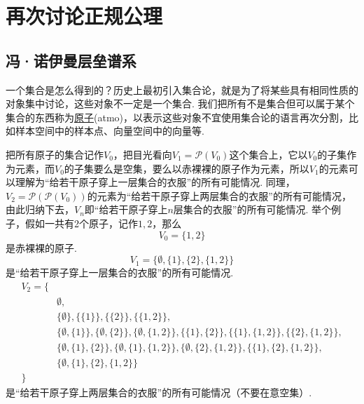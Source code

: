 \documentclass[main.tex]{subfiles}
\begin{document}

\section{再次讨论正规公理}

\subsection{冯·诺伊曼层垒谱系}

一个集合是怎么得到的？历史上最初引入集合论，就是为了将某些具有相同性质的对象集中讨论，这些对象不一定是一个集合. 我们把所有不是集合但可以属于某个集合的东西称为\uline{原子}(atmo)，以表示这些对象不宜使用集合论的语言再次分割，比如样本空间中的样本点、向量空间中的向量等. 

把所有原子的集合记作\(V_0\)，把目光看向\(V_1 = \mathcal{P}(V_0)\)这个集合上，它以\(V_0\)的子集作为元素，而\(V_0\)的子集要么是空集，要么以赤裸裸的原子作为元素，所以\(V_1\)的元素可以理解为“给若干原子穿上一层集合的衣服”的所有可能情况. 同理，\(V_2 = \mathcal{P}(\mathcal{P}(V_0))\)的元素为“给若干原子穿上两层集合的衣服”的所有可能情况，由此归纳下去，\(V_n\)即“给若干原子穿上\(n\)层集合的衣服”的所有可能情况. 举个例子，假如一共有2个原子，记作\(1,2\)，那么
\[V_0 = \{1,2\}\]
是赤裸裸的原子.
\[V_1 = \{\emptyset,\{1\},\{2\},\{1,2\}\}\]
是“给若干原子穿上一层集合的衣服”的所有可能情况.
\begin{align*}
    V_2 = \{& \\
    &\emptyset,\\
    &\{\emptyset\},\{\{1\}\},\{\{2\}\},\{\{1,2\}\},\\
    &\{\emptyset,\{1\}\},\{\emptyset,\{2\}\},\{\emptyset,\{1,2\}\},\{\{1\},\{2\}\},\{\{1\},\{1,2\}\},\{\{2\},\{1,2\}\},\\
    &\{\emptyset,\{1\},\{2\}\},\{\emptyset,\{1\},\{1,2\}\},\{\emptyset,\{2\},\{1,2\}\},\{\{1\},\{2\},\{1,2\}\},\\
    &\{\emptyset,\{1\},\{2\},\{1,2\}\}\\
    \}
\end{align*}
是“给若干原子穿上两层集合的衣服”的所有可能情况（不要在意空集）.
\end{document}

